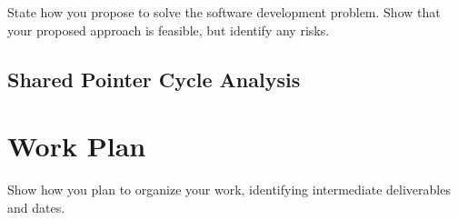 \documentclass{proposal}
\begin{document}
    State how you propose to solve the software development problem.
    Show that your proposed approach is feasible, but identify any risks.

    \subsection{Shared Pointer Cycle Analysis}\label{subsec:shared-pointer-cycle-analysis}



    \section{Work Plan}\label{sec:work-plan}

    Show how you plan to organize your work, identifying intermediate deliverables and dates.




    
    
\end{document}
